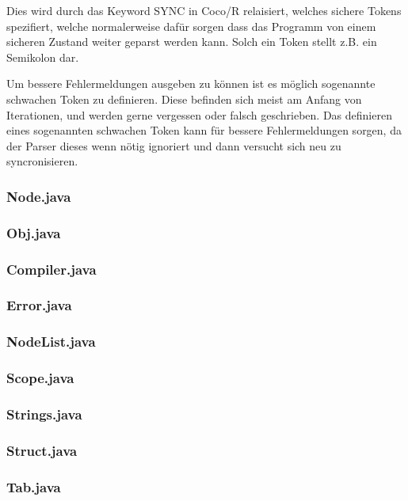 Dies wird durch das Keyword SYNC in Coco/R relaisiert, welches sichere Tokens spezifiert, welche normalerweise daf\"ur sorgen dass das Programm von einem sicheren Zustand weiter geparst werden kann. Solch ein Token stellt z.B. ein Semikolon dar.


Um bessere Fehlermeldungen ausgeben zu k\"onnen ist es m\"oglich sogenannte schwachen Token zu definieren. Diese befinden sich meist am Anfang von Iterationen, und werden gerne vergessen oder falsch geschrieben. Das definieren eines sogenannten schwachen Token kann f\"ur bessere Fehlermeldungen sorgen, da der Parser dieses wenn n\"otig ignoriert und dann versucht sich neu zu syncronisieren.

\subsubsection{Node.java}

\subsubsection{Obj.java}

\subsubsection{Compiler.java}

\subsubsection{Error.java}

\subsubsection{NodeList.java}

\subsubsection{Scope.java}

\subsubsection{Strings.java}

\subsubsection{Struct.java}

\subsubsection{Tab.java}